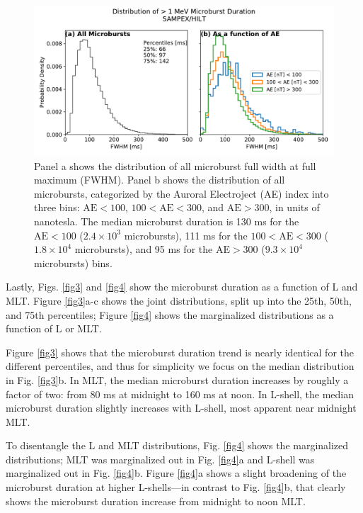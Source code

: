 \documentclass[draft]{agujournal2019}
\begin{document}
\begin{figure}
\noindent\includegraphics[width=\textwidth]{figures/fig2.pdf}
\caption{Panel a shows the distribution of all microburst full width at full maximum (FWHM). Panel b shows the distribution of all microbursts, categorized by the Auroral Electroject (AE) index into three bins: $\mathrm{AE} < 100$, $100 < \mathrm{AE} < 300$, and $\mathrm{AE} > 300$, in units of nanotesla. The median microburst duration is 130 ms for the $\mathrm{AE} < 100$ ($2.4\times 10^{3}$ microbursts), 111 ms for the $100 < \mathrm{AE} < 300$ ($1.8\times 10^{4}$ microbursts), and 95 ms for the $ \mathrm{AE} > 300$ ($9.3\times 10^{4}$ microbursts) bins.}
\label{fig2}
\end{figure}

Lastly, Figs. \ref{fig3} and \ref{fig4} show the microburst duration as a function of L and MLT. Figure \ref{fig3}a-c shows the joint distributions, split up into the 25th, 50th, and 75th percentiles; Figure \ref{fig4} shows the marginalized distributions as a function of L or MLT.

Figure \ref{fig3} shows that the microburst duration trend is nearly identical for the different percentiles, and thus for simplicity we focus on the median distribution in Fig. \ref{fig3}b. In MLT, the median microburst duration increases by roughly a factor of two: from 80 ms at midnight to 160 ms at noon. In L-shell, the median microburst duration slightly increases with L-shell, most apparent near midnight MLT.

To disentangle the L and MLT distributions, Fig. \ref{fig4} shows the marginalized distributions; MLT was marginalized out in Fig. \ref{fig4}a and L-shell was marginalized out in Fig. \ref{fig4}b. Figure \ref{fig4}a shows a slight broadening of the microburst duration at higher L-shells---in contrast to Fig. \ref{fig4}b, that clearly shows the microburst duration increase from midnight to noon MLT.
\end{document}
